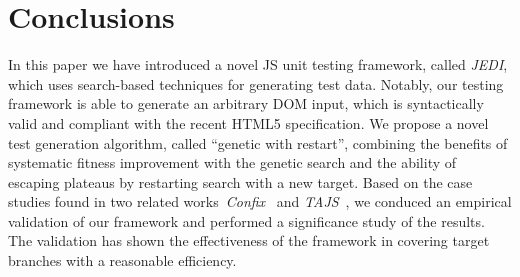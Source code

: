 \section{Conclusions}
\label{sec:concl}

In this paper we have introduced a novel JS unit testing framework, called \emph{JEDI}, which uses search-based techniques for generating test data. Notably, our testing framework is able to generate an arbitrary DOM input, which is syntactically valid and compliant with the recent HTML5 specification. We propose a novel test generation algorithm, called ``genetic with restart'', combining the benefits of systematic fitness improvement with the genetic search and the ability of escaping plateaus by restarting search with a new target. Based on the case studies found in two related works~\emph{Confix}~\cite{amin:ase15} and \emph{TAJS}~\cite{dom2011}, we conduced an empirical validation of our framework and performed a significance study of the results. The validation has shown the effectiveness of the framework in covering target branches with a reasonable efficiency.
